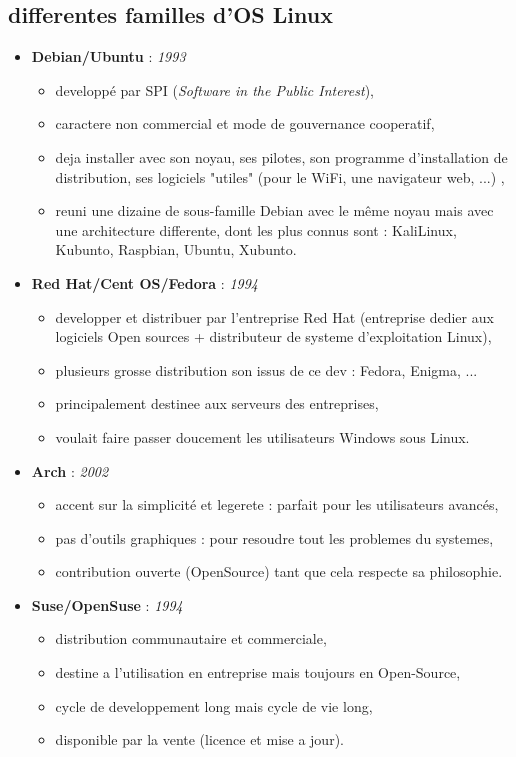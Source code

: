 \subsection{differentes familles d'OS Linux} 

\begin{itemize}
\item \textbf{Debian/Ubuntu} : \textit{1993}
    \begin{itemize}
    \item developpé par SPI (\textit{Software in the Public Interest}),
	\item caractere non commercial et mode de gouvernance cooperatif,
	\item deja installer avec son noyau, ses pilotes, son programme d'installation de distribution, ses logiciels "utiles" (pour le WiFi, une navigateur web, ...) ,
	\item reuni une dizaine de sous-famille Debian avec le même noyau mais avec une architecture differente, dont les plus connus sont : KaliLinux, Kubunto, Raspbian, Ubuntu, Xubunto.\newline 
    \end{itemize}
   
\item \textbf{Red Hat/Cent OS/Fedora} : \textit{1994}
    \begin{itemize}
	\item developper et distribuer par l'entreprise Red Hat (entreprise dedier aux logiciels Open sources + distributeur de systeme d'exploitation Linux),
	\item plusieurs grosse distribution son issus de ce dev : Fedora, Enigma, ...
	\item principalement destinee aux serveurs des entreprises,
	\item voulait faire passer doucement les utilisateurs Windows sous Linux.\newline
	\end{itemize}

\item \textbf{Arch} : \textit{2002}
    \begin{itemize}
	\item accent sur la simplicité et legerete : parfait pour les utilisateurs avancés,
	\item pas d'outils graphiques : pour resoudre tout les problemes du systemes,
	\item contribution ouverte (OpenSource) tant que cela respecte sa philosophie.\newline
	\end{itemize}
	
\item \textbf{Suse/OpenSuse} : \textit{1994}
    \begin{itemize}
	\item distribution communautaire et commerciale,
	\item destine a l'utilisation en entreprise mais toujours en Open-Source,
	\item cycle de developpement long mais cycle de vie long,
	\item disponible par la vente (licence et mise a jour).
	\end{itemize}
\end{itemize}
